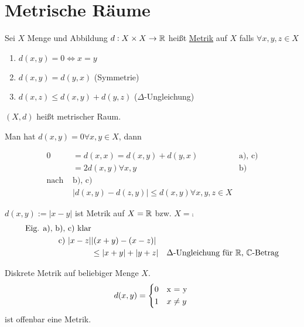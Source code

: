 \chapter{Metrische Räume}
\begin{mydefn}[Metrik]
    Sei $X$ Menge und Abbildung $d: X \times X \to \mathbb{R}$ heißt \underline{Metrik} auf $X$ falls $\forall x,y,z \in X$
    \begin{enumerate}[label={\alph*)}]
    \item $d(x,y) = 0 \Leftrightarrow x=y$ 
    \item $d(x,y) = d(y,x)$ (Symmetrie)
    \item $d(x,z) \leq d(x,y) + d(y,z)$ ($\Delta$-Ungleichung)
    \end{enumerate}
    $(X,d)$ heißt metrischer Raum.
\end{mydefn}
Man hat $d(x,y) = 0 \forall x,y \in X$, dann

\begin{align}
    0 &= d(x,x) = d(x,y) + d(y,x) & \text{a), c)}\nonumber\\
    & = 2d(x,y) \forall x,y & \text{b)}\nonumber\\
    \text{nach } & \text{b), c) } &\nonumber\\
    & \vert d(x,y) -d(z,y)\vert \leq d(x,y) \forall x,y,z \in X &
\end{align}

\begin{exmpn}[Standardmetrik]\label{8_1_exmp_metrik}
	$d(x,y) := \vert x-y\vert$ ist Metrik auf $X=\mathbb{R}$ bzw. $X=\comp$
    \begin{align*}
        \text{Eig. a), b), c) klar}& &\\
        \text{c) } \vert x-z\vert& \vert (x+y)-(x-z)\vert &\\
        &\leq \vert x+y\vert + \vert y+z\vert & \Delta\text{-Ungleichung für }\mathbb{R}\text{, }\mathbb{C}\text{-Betrag}
    \end{align*} 
\end{exmpn}

\begin{exmpn}
	Diskrete Metrik auf beliebiger Menge $X$.\\
    \[d(x,y) = 
    \begin{dcases*}
        0 & x = y\\
        1 & $x \neq y$
    \end{dcases*}\]
    ist offenbar eine Metrik.
\end{exmpn}

